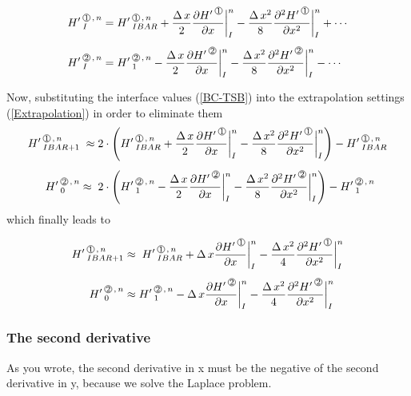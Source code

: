 \begin{align}
\label{BC-TSB}
\HL{I}{1}{n} & = \HL{IBAR}{1}{n}  + \frac{\DX}{2} \frac{\HPN{1}} {\DXP} \bigg|_{I}^n 
                                                      - \frac{\DXT}{8} \frac{\HPNT{1}} {\DXPT} \bigg|_{I}^n  + \cdots  \\[1ex]
\HL{I}{2}{n} & =  \HL{1}{2}{n}  - \frac{\DX}{2} \frac{\HPN{2}} {\DXP} \bigg|_{I}^n 
                                                - \frac{\DXT}{8}\frac{\HPNT{2}} {\DXPT} \bigg|_{I}^n  - \cdots         \nonumber                                            
\end{align}


Now, substituting the interface values (\ref{BC-TSB}) into the extrapolation settings (\ref{Extrapolation}) in order to eliminate them
\begin{align}
\HL{IBAR+1}{1}{n} & \; \approx 2 \cdot \left( \HL{IBAR}{1}{n}  + \frac{\DX}{2} \frac{\HPN{1}} {\DXP} \bigg|_{I}^n 
                                                      - \frac{\DXT}{8} \frac{\HPNT{1}} {\DXPT} \bigg|_{I}^n  \right) -  \HL{IBAR}{1}{n} \label{BC-TSD}
 \\[1ex]
\HL{0}{2}{n} & \approx \; 2 \cdot \left( \HL{1}{2}{n}  - \frac{\DX}{2} \frac{\HPN{2}} {\DXP} \bigg|_{I}^n 
                                                - \frac{\DXT}{8}\frac{\HPNT{2}} {\DXPT} \bigg|_{I}^n \right)    -  \HL{1}{2}{n}      \nonumber                                           
\end{align}
which finally leads to

\begin{align}
\HL{IBAR+1}{1}{n} & \approx \;  \HL{IBAR}{1}{n}  + \DX \frac{\HPN{1}} {\DXP} \bigg|_{I}^n 
                                                      - \frac{\DXT}{4} \frac{\HPNT{1}} {\DXPT} \bigg|_{I}^n  \label{BC-TSD}
 \\[1ex]
\HL{0}{2}{n} & \approx  \HL{1}{2}{n}  - \DX \frac{\HPN{2}} {\DXP} \bigg|_{I}^n 
                                                - \frac{\DXT}{4}\frac{\HPNT{2}} {\DXPT} \bigg|_{I}^n     \nonumber                                           
\end{align}

\newpage
\subsubsection{The second derivative}
As you wrote, the second derivative in x must be the negative of the second derivative in y, because we solve the Laplace problem.

